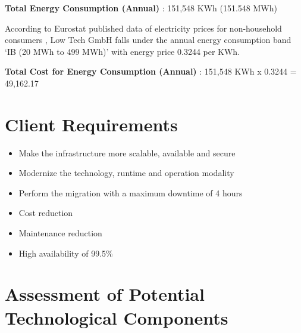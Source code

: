 \documentclass{llncs}
\begin{document}
\textbf{Total Energy Consumption (Annual)} : 151,548 KWh (151.548 MWh)

According to Eurostat published data of electricity prices for non-household consumers \cite{eurostat2023}, Low Tech GmbH falls under the annual energy consumption band 
`IB (20 MWh to 499 MWh)' with energy price 0.3244 \EUR{} per KWh.


\textbf{Total Cost for Energy Consumption (Annual)} : 151,548 KWh x 0.3244 \EUR{} = 49,162.17 \EUR{}

\section{Client Requirements}

\begin{itemize}
  \item Make the infrastructure more scalable, available and secure
  \item Modernize the technology, runtime and operation modality
  \item Perform the migration with a maximum downtime of 4 hours
  \item Cost reduction
  \item Maintenance reduction
  \item High availability of 99.5\%
\end{itemize}

\section{Assessment of Potential Technological Components}
\end{document}
